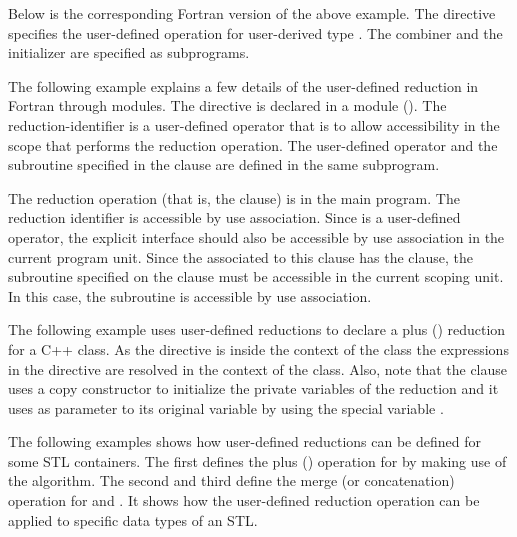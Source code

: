 
Below is the corresponding Fortran version of the above example.  
The  directive specifies the user-defined 
operation  for user-derived type .  
The combiner  and the initializer  are 
specified as subprograms.



The following example explains a few details of the user-defined reduction 
in Fortran through modules. The  directive 
is declared in a module (). 
The reduction-identifier  is a user-defined operator that is
to allow accessibility in the scope that performs the reduction
operation.
The user-defined operator  and the subroutine  
specified in the  clause are defined in the same subprogram.

The reduction operation (that is, the  clause) is in the main program.
The reduction identifier  is accessible by use association.
Since  is a user-defined operator, the explicit interface
should also be accessible by use association in the current
program unit.
Since the  associated to this  clause
has the  clause, the subroutine specified on the clause
must be accessible in the current scoping unit.  In this case,
the subroutine  is accessible by use association.



The following example uses user-defined reductions to declare a plus (\kcode{+}) 
reduction for a C++ class. As the  directive 
is inside the context of the  class the expressions in the 
 directive are resolved in the context of 
the class. Also, note that the  clause uses a copy 
constructor to initialize the private variables of the reduction and it uses 
as parameter to its original variable by using the special variable 
.


The following examples shows how user-defined reductions can be defined for 
some STL containers. The first  defines the 
plus (\kcode{+}) operation for  by making use of the 
 algorithm. The second and third define the merge (or 
concatenation) operation for  and . 
It shows how the user-defined reduction operation can be applied to specific 
data types of an STL.


